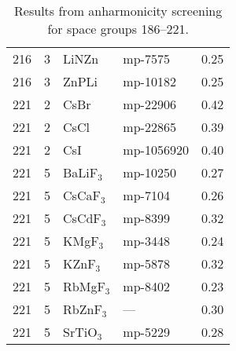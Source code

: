 \begin{table}[t]
\begin{tabular}{rrllr}
         216 &            3 &        LiNZn &    mp-7575 &       0.25 \\
         216 &            3 &        ZnPLi &   mp-10182 &       0.25 \\
         221 &            2 &         CsBr &   mp-22906 &       0.42 \\
         221 &            2 &         CsCl &   mp-22865 &       0.39 \\
         221 &            2 &          CsI & mp-1056920 &       0.40 \\
         221 &            5 &    BaLiF$_3$ &   mp-10250 &       0.27 \\
         221 &            5 &    CsCaF$_3$ &    mp-7104 &       0.26 \\
         221 &            5 &    CsCdF$_3$ &    mp-8399 &       0.32 \\
         221 &            5 &     KMgF$_3$ &    mp-3448 &       0.24 \\
         221 &            5 &     KZnF$_3$ &    mp-5878 &       0.32 \\
         221 &            5 &    RbMgF$_3$ &    mp-8402 &       0.23 \\
         221 &            5 &    RbZnF$_3$ &    ---     &       0.30 \\
         221 &            5 &    SrTiO$_3$ &    mp-5229 &       0.28 \\
         
\bottomrule
\end{tabular}
   \caption{Results from anharmonicity screening for space groups 186--221.}
   \label{tab:screening.sigma.2}
 \end{table}         
  
